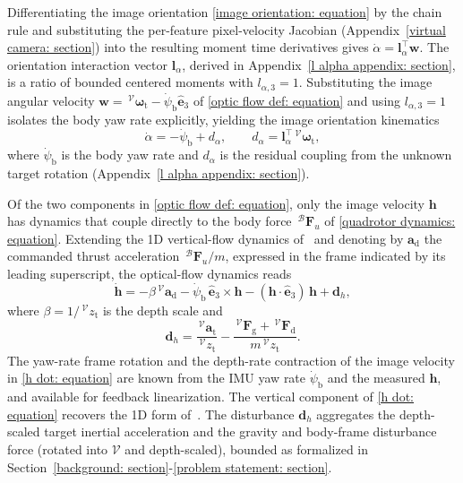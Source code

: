 \documentclass{IEEEtaes}
\begin{document}
Differentiating the image orientation \eqref{image orientation: equation} by the chain rule and substituting the per-feature pixel-velocity Jacobian (Appendix~\ref{virtual camera: section}) into the resulting moment time derivatives gives $\dot{\alpha}=\boldsymbol{l}_\alpha^\top\boldsymbol{w}$. The orientation interaction vector $\boldsymbol{l}_\alpha$, derived in Appendix~\ref{l alpha appendix: section}, is a ratio of bounded centered moments with $l_{\alpha,3}=1$. Substituting the image angular velocity $\boldsymbol{w} = \,^\mathcal{V}\boldsymbol{\omega}_\text{t} - \dot{\psi}_\text{b}\hat{\boldsymbol{e}}_3$ of \eqref{optic flow def: equation} and using $l_{\alpha,3}=1$ isolates the body yaw rate explicitly, yielding the image orientation kinematics
\begin{equation} \label{alpha dot: equation}
    \dot{\alpha} = - \dot{\psi}_\text{b} + d_{\alpha},\qquad d_\alpha = \boldsymbol{l}_\alpha^\top\,^\mathcal{V}\boldsymbol{\omega}_\text{t},
\end{equation}
where $\dot{\psi}_\text{b}$ is the body yaw rate and $d_{\alpha}$ is the residual coupling from the unknown target rotation (Appendix~\ref{l alpha appendix: section}).

Of the two components in \eqref{optic flow def: equation}, only the image velocity $\boldsymbol{h}$ has dynamics that couple directly to the body force $\,^\mathcal{B}\boldsymbol{F}_u$ of \eqref{quadrotor dynamics: equation}. Extending the 1D vertical-flow dynamics of~\cite{singhal2025} and denoting by $\boldsymbol{a}_\text{d}$ the commanded thrust acceleration $\,^\mathcal{B}\boldsymbol{F}_u/m$, expressed in the frame indicated by its leading superscript, the optical-flow dynamics reads
\begin{equation} \label{h dot: equation}
    \dot{\boldsymbol{h}} = -\beta\,^\mathcal{V}\boldsymbol{a}_\text{d} - \dot{\psi}_\text{b}\,\hat{\boldsymbol{e}}_3\times\boldsymbol{h} - (\boldsymbol{h}\cdot\hat{\boldsymbol{e}}_3)\,\boldsymbol{h} + \boldsymbol{d}_h,
\end{equation}
where $\beta = 1/\,^\mathcal{V}z_\text{t}$ is the depth scale and
\begin{equation} \label{d h: equation}
\boldsymbol{d}_h = \frac{\,^\mathcal{V}\boldsymbol{a}_\text{t}}{\,^\mathcal{V}z_\text{t}} - \frac{\,^\mathcal{V}\boldsymbol{F}_\text{g}+\,^\mathcal{V}\boldsymbol{F}_\text{d}}{m\,^\mathcal{V}z_\text{t}}.
\end{equation}
The yaw-rate frame rotation and the depth-rate contraction of the image velocity in \eqref{h dot: equation} are known from the IMU yaw rate $\dot{\psi}_\text{b}$ and the measured $\boldsymbol{h}$, and available for feedback linearization. The vertical component of \eqref{h dot: equation} recovers the 1D form of~\cite{singhal2025}. The disturbance $\boldsymbol{d}_h$ aggregates the depth-scaled target inertial acceleration and the gravity and body-frame disturbance force (rotated into $\mathcal{V}$ and depth-scaled), bounded as formalized in Section~\ref{background: section}-\ref{problem statement: section}.
\end{document}
